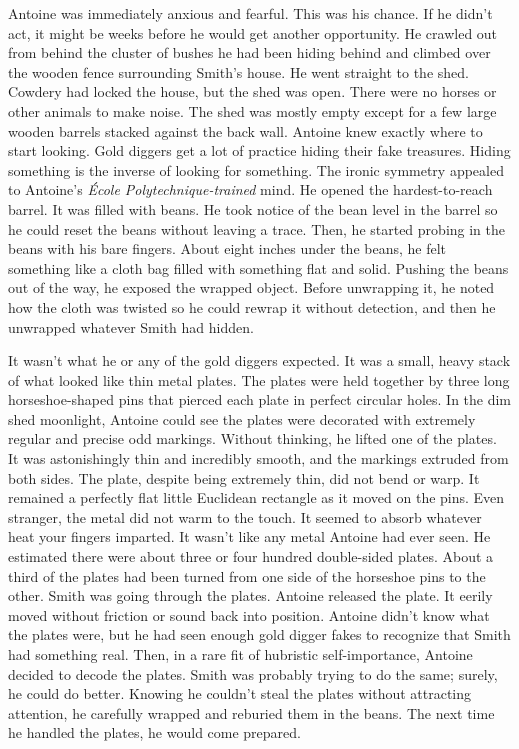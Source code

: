 Antoine was immediately anxious and fearful. This was his chance. If he
didn't act, it might be weeks before he would get another opportunity.
He crawled out from behind the cluster of bushes he had been hiding
behind and climbed over the wooden fence surrounding Smith's house. He
went straight to the shed. Cowdery had locked the house, but the shed
was open. There were no horses or other animals to make noise. The shed
was mostly empty except for a few large wooden barrels stacked against
the back wall. Antoine knew exactly where to start looking. Gold diggers
get a lot of practice hiding their fake treasures. Hiding something is
the inverse of looking for something. The ironic symmetry appealed to
Antoine's \emph{École Polytechnique-trained} mind. He opened the
hardest-to-reach barrel. It was filled with beans. He took notice of the
bean level in the barrel so he could reset the beans without leaving a
trace. Then, he started probing in the beans with his bare fingers.
About eight inches under the beans, he felt something like a cloth bag
filled with something flat and solid. Pushing the beans out of the way,
he exposed the wrapped object. Before unwrapping it, he noted how the
cloth was twisted so he could rewrap it without detection, and then he
unwrapped whatever Smith had hidden.

It wasn't what he or any of the gold diggers expected. It was a small,
heavy stack of what looked like thin metal plates. The plates were held
together by three long horseshoe-shaped pins that pierced each plate in
perfect circular holes. In the dim shed moonlight, Antoine could see the
plates were decorated with extremely regular and precise odd markings.
Without thinking, he lifted one of the plates. It was astonishingly thin
and incredibly smooth, and the markings extruded from both sides. The
plate, despite being extremely thin, did not bend or warp. It remained a
perfectly flat little Euclidean rectangle as it moved on the pins. Even
stranger, the metal did not warm to the touch. It seemed to absorb
whatever heat your fingers imparted. It wasn't like any metal Antoine
had ever seen. He estimated there were about three or four hundred
double-sided plates. About a third of the plates had been turned from
one side of the horseshoe pins to the other. Smith was going through the
plates. Antoine released the plate. It eerily moved without friction or
sound back into position. Antoine didn't know what the plates were, but
he had seen enough gold digger fakes to recognize that Smith had
something real. Then, in a rare fit of hubristic self-importance,
Antoine decided to decode the plates. Smith was probably trying to do
the same; surely, he could do better. Knowing he couldn't steal the
plates without attracting attention, he carefully wrapped and reburied
them in the beans. The next time he handled the plates, he would come
prepared.

